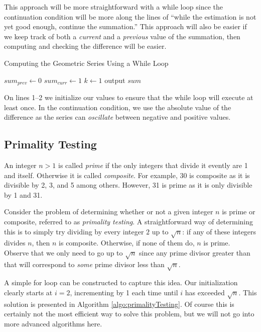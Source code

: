 This approach will be more straightforward with a while loop since the 
continuation condition will be more along the lines of ``while the estimation
is not yet good enough, continue the summation.''  This approach will
also be easier if we keep track of both a \emph{current} and a \emph{previous}
value of the summation, then computing and checking the difference will
be easier.

\begin{algorithm}[h]
\caption{Computing the Geometric Series Using a While Loop}
\label{algo:geometricSeriesWhileLoop}
$sum_{prev} \leftarrow 0$ \;
$sum_{curr} \leftarrow 1$ \;
$k \leftarrow 1$ \;
output $sum$ \;
\end{algorithm}

On lines 1--2 we initialize our values to ensure that the while loop will
execute at least once.  In the continuation condition, we use the absolute
value of the difference as the series can \emph{oscillate} between negative
and positive values.

\subsection{Primality Testing}

An integer $n > 1$ is called \emph{prime} if the only integers that 
divide it evently are 1 
and itself.  Otherwise it is called \emph{composite}.  For example, 30 is composite
as it is divisible by 2, 3, and 5 among others.  However, 31 is prime as it is only 
divisible by 1 and 31.

Consider the problem of determining whether or not a given integer $n$ is prime or 
composite, referred to as \emph{primality testing}.  A straightforward way of determining
this is to simply try dividing by every integer $2$ up to $\sqrt{n}$: if any of these integers
divides $n$, then $n$ is composite.  Otherwise, if none of them do, $n$ is prime.  
Observe that we only need to go up to $\sqrt{n}$ since any prime divisor greater
than that will correspond to \emph{some} prime divisor less than $\sqrt{n}$.

A simple for loop can be constructed to capture this idea. Our initialization clearly starts at $i = 2$, 
incrementing by 1 each time until $i$ has exceeded $\sqrt{n}$.  This solution
is presented in Algorithm \ref{algo:primalityTesting}.  Of course this is certainly
not the most efficient way to solve this problem, but we will not go into 
more advanced algorithms here.

